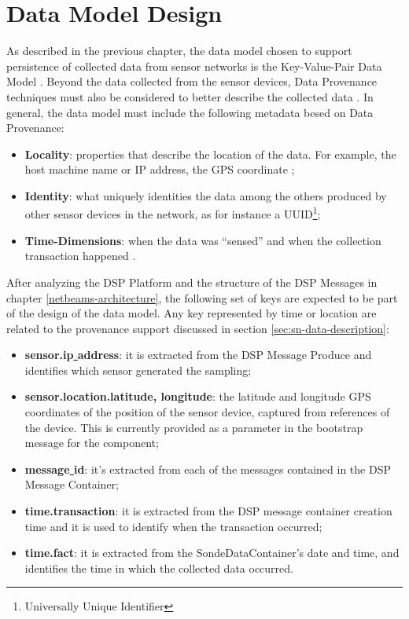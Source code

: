 \section{Data Model Design}
\label{sec:dsp-persistence-data-model}

As described in the previous chapter, the data model chosen to support
persistence of collected data from sensor networks is the Key-Value-Pair Data
Model \cite{db-kvp}. Beyond the data collected from the sensor devices, Data
Provenance techniques must also be considered to better describe the collected
data \cite{sn-provenance}. In general, the data model must include the
following metadata besed on Data Provenance:

\begin{itemize}
  \item \textbf{Locality}: properties that describe the location of the data.
  For example, the host machine name or IP address, the GPS coordinate
  \cite{gps};
  \item \textbf{Identity}: what uniquely identities the data among the others
  produced by other sensor devices in the network, as for instance a
  UUID\footnote{Universally Unique Identifier};
  \item \textbf{Time-Dimensions}: when the data was ``sensed''
  \cite{db-provenance} and when the collection transaction happened
  \cite{sn-time-series}.
\end{itemize}

After analyzing the DSP Platform and the structure of the DSP Messages in
chapter \ref{netbeams-architecture}, the following set of keys are expected to
be part of the design of the data model. Any key represented by time or
location are related to the provenance support discussed in section
\ref{sec:sn-data-description}:

\begin{itemize}
  \item \textbf{sensor.ip\underline{ }address}: it is extracted
  from the DSP Message Produce and identifies which sensor generated the sampling;
  \item \textbf{sensor.location.latitude, longitude}: the latitude and
  longitude GPS coordinates of the position of the sensor device, captured from
  references of the device. This is currently provided as a parameter in the
  bootstrap message for the component;
  \item \textbf{message\underline{ }id}: it's extracted from each of the
  messages contained in the DSP Message Container;
  \item \textbf{time.transaction}: it is extracted from the DSP
  message container creation time and it is used to identify when the
  transaction occurred;
  \item \textbf{time.fact}: it is extracted from the
  SondeDataContainer's date and time, and identifies the time in which the
  collected data occurred.
\end{itemize}

